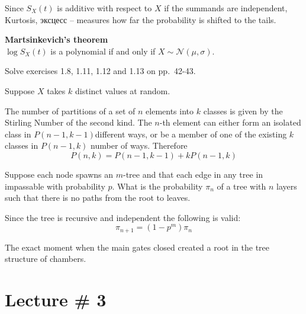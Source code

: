 \documentclass[a4paper]{article}
\newcommand{\rus}[1]{\foreignlanguage{russian}{#1}}
\begin{document}
Since $S_X(t)$ is additive with respect to $X$ if the summands are independent,
Kurtosis, \rus{эксцесс} -- measures how far the probability is shifted to the tails.

\textbf{Martsinkevich's theorem}\hfill\\
$\log S_X(t)$ is a polynomial if and only if $X\sim\mathcal{N}(\mu,\sigma)$.


Solve exercises 1.8, 1.11, 1.12 and 1.13 on pp.~42-43.


Suppose $X$ takes $k$ distinct values at random. 



The number of partitions of a set of $n$ elements into $k$ classes is given by the Stirling Number of the second kind.
The $n$-th element can either form an isolated class in $P(n-1,k-1)$different ways,
or be a member of one of the existing $k$ classes in $P(n-1,k)$ number of ways.
Therefore \[P(n,k) = P(n-1,k-1) + k P(n-1,k)\]


Suppose each node spawns an $m$-tree and that each edge in any tree in impassable with probability $p$.
What is the probability $\pi_n$ of a tree with $n$ layers such that there is no paths from the root to leaves.

Since the tree is recursive and independent the following is valid:
\[\pi_{n+1} = (1 - p^m) \pi_n\]

The exact moment when the main gates closed created a root in the tree structure of chambers.


\section{Lecture \# 3} %
\label{sec:lecture_3}


\end{document}
